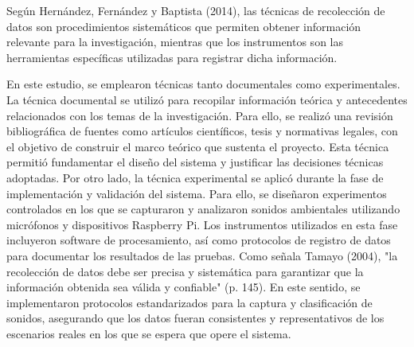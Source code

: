
Según Hernández, Fernández y Baptista (2014), las técnicas de recolección de datos son procedimientos sistemáticos que permiten obtener información relevante para la investigación, mientras que los instrumentos son las herramientas específicas utilizadas para registrar dicha información.

En este estudio, se emplearon técnicas tanto documentales como experimentales. La técnica documental se utilizó para recopilar información teórica y antecedentes relacionados con los temas de la investigación. Para ello, se realizó una revisión bibliográfica de fuentes como artículos científicos, tesis y normativas legales, con el objetivo de construir el marco teórico que sustenta el proyecto. Esta técnica permitió fundamentar el diseño del sistema y justificar las decisiones técnicas adoptadas. Por otro lado, la técnica experimental se aplicó durante la fase de implementación y validación del sistema. Para ello, se diseñaron experimentos controlados en los que se capturaron y analizaron sonidos ambientales utilizando micrófonos y dispositivos Raspberry Pi. Los instrumentos utilizados en esta fase incluyeron software de procesamiento, así como protocolos de registro de datos para documentar los resultados de las pruebas. Como señala Tamayo (2004), "la recolección de datos debe ser precisa y sistemática para garantizar que la información obtenida sea válida y confiable" (p. 145). En este sentido, se implementaron protocolos estandarizados para la captura y clasificación de sonidos, asegurando que los datos fueran consistentes y representativos de los escenarios reales en los que se espera que opere el sistema.
